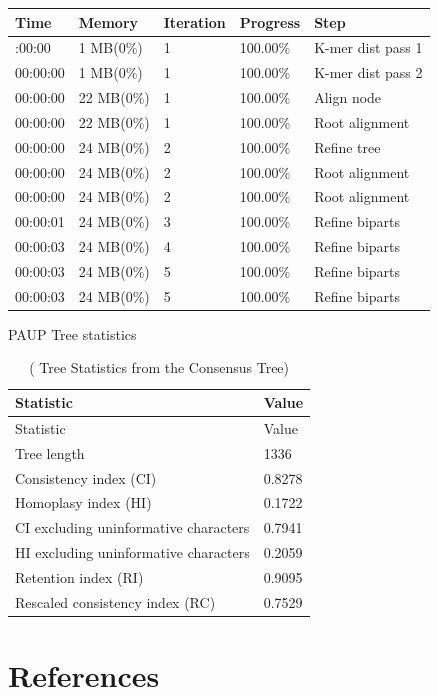 \documentclass[
]{article}
\begin{document}
\begin{longtable}[]{@{}lllll@{}}
\toprule\noalign{}
Time & Memory & Iteration & Progress & Step \\
\midrule\noalign{}
\endhead
\bottomrule\noalign{}
\endlastfoot
00:00:00 & 1 MB(0\%) & 1 & 100.00\% & K-mer dist pass 1 \\
00:00:00 & 1 MB(0\%) & 1 & 100.00\% & K-mer dist pass 2 \\
00:00:00 & 22 MB(0\%) & 1 & 100.00\% & Align node \\
00:00:00 & 22 MB(0\%) & 1 & 100.00\% & Root alignment \\
00:00:00 & 24 MB(0\%) & 2 & 100.00\% & Refine tree \\
00:00:00 & 24 MB(0\%) & 2 & 100.00\% & Root alignment \\
00:00:00 & 24 MB(0\%) & 2 & 100.00\% & Root alignment \\
00:00:01 & 24 MB(0\%) & 3 & 100.00\% & Refine biparts \\
00:00:03 & 24 MB(0\%) & 4 & 100.00\% & Refine biparts \\
00:00:03 & 24 MB(0\%) & 5 & 100.00\% & Refine biparts \\
00:00:03 & 24 MB(0\%) & 5 & 100.00\% & Refine biparts \\
\end{longtable}

PAUP Tree statistics

\begin{longtable}[]{@{}ll@{}}
\caption{( Tree Statistics from the Consensus Tree)}\tabularnewline
\toprule\noalign{}
Statistic & Value \\
\midrule\noalign{}
\endfirsthead
\toprule\noalign{}
Statistic & Value \\
\midrule\noalign{}
\endhead
\bottomrule\noalign{}
\endlastfoot
Tree length & 1336 \\
Consistency index (CI) & 0.8278 \\
Homoplasy index (HI) & 0.1722 \\
CI excluding uninformative characters & 0.7941 \\
HI excluding uninformative characters & 0.2059 \\
Retention index (RI) & 0.9095 \\
Rescaled consistency index (RC) & 0.7529 \\
\end{longtable}

\newpage

\section*{References}\label{references}
\end{document}
